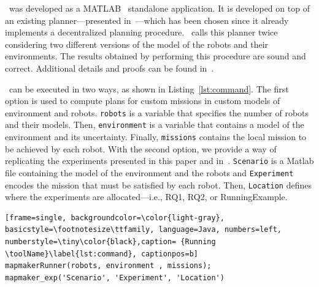 
\toolName\  was developed as a  MATLAB~\cite{matlab} standalone application.
It is developed on top of an existing planner---presented in~\cite{tumova2016multi}---which has been chosen since it already implements a decentralized planning procedure.
\toolName\ calls this planner twice considering two different versions of the model of the robots and their environments. 
The results obtained by performing this procedure are sound and correct.
Additional details and proofs can be found in~\cite{menghi2018multi}.


\toolName\ can be executed in two ways, as shown in Listing~\ref{lst:command}.
The first option is used to compute plans for custom missions in custom models of environment and robots.
\texttt{robots} is a variable that specifies the number of robots and their models.
Then, \texttt{environment} is a variable that contains a model of the environment and its uncertainty.
Finally, \texttt{missions} contains the local mission to be achieved by each robot.
With the second option, we provide a way of replicating the experiments presented in this paper and in~\cite{menghi2018multi}.
\texttt{Scenario} is a Matlab file containing the model of the environment and the robots and \texttt{Experiment} encodes the mission that must be satisfied by each robot.
Then, \texttt{Location} defines where the experiments are allocated---i.e., RQ1, RQ2, or RunningExample.



\begin{lstlisting}[frame=single, backgroundcolor=\color{light-gray}, basicstyle=\footnotesize\ttfamily, language=Java, numbers=left, numberstyle=\tiny\color{black},caption= {Running \toolName}\label{lst:command}, captionpos=b]
mapmakerRunner(robots, environment , missions);
mapmaker_exp('Scenario', 'Experiment', 'Location')
\end{lstlisting}






